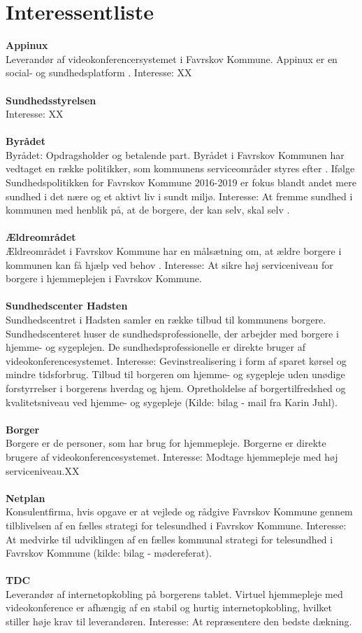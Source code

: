 \documentclass[10pt,a4paper]{article}
\begin{document}
\section{Interessentliste}
\textbf{Appinux}\\
 Leverandør af videokonferencersystemet i Favrskov Kommune. Appinux er en social- og sundhedsplatform \cite{appinuxwebsite}.
Interesse: XX\\ \\
\textbf{Sundhedsstyrelsen}\\
Interesse: XX\\ \\
\textbf{Byrådet}\\
Byrådet: Opdragsholder og betalende part. Byrådet i Favrskov Kommunen har vedtaget en række politikker, som kommunens serviceområder styres efter \cite{favrskovkommune}. Ifølge Sundhedspolitikken for Favrskov Kommune 2016-2019 er fokus blandt andet mere sundhed i det nære og et aktivt liv i sundt miljø.
Interesse: At fremme sundhed i kommunen med henblik på, at de borgere, der kan selv, skal selv \cite{favrskovkommune2}.\\ \\
\textbf{Ældreområdet}\\
Ældreområdet i Favrskov Kommune har en målsætning om, at ældre borgere i kommunen kan få hjælp ved behov \cite{favrskovkommune3}.
Interesse: At sikre høj serviceniveau for borgere i hjemmeplejen i Favrskov Kommune. \\ \\
\textbf{Sundhedscenter Hadsten}\\
Sundhedscentret i Hadsten samler en række tilbud til kommunens borgere. Sundhedscenteret huser de sundhedsprofessionelle, der arbejder med borgere i hjemme- og sygeplejen. De sundhedsprofessionelle er direkte bruger af videokonferencesystemet.
Interesse: Gevinstrealisering i form af sparet kørsel og mindre tidsforbrug. Tilbud til borgeren om hjemme- og sygepleje uden unødige forstyrrelser i borgerens hverdag og hjem. Opretholdelse af borgertilfredshed og kvalitetsniveau ved hjemme- og sygepleje (Kilde: bilag - mail fra Karin Juhl).\\ \\
\textbf{Borger}\\
Borgere er de personer, som har brug for hjemmepleje. Borgerne er direkte brugere af videokonferencesystemet.
Interesse: Modtage hjemmepleje med høj serviceniveau.XX\\ \\
\textbf{Netplan}\\
Konsulentfirma\cite{netplan}, hvis opgave er at vejlede og rådgive Favrskov Kommune gennem tilblivelsen af en fælles strategi for telesundhed i Favrskov Kommune.
Interesse: At medvirke til udviklingen af en fælles kommunal strategi for telesundhed i Favrskov Kommune (kilde: bilag - mødereferat).\\ \\
\textbf{TDC}\\
Leverandør af internetopkobling på borgerens tablet. Virtuel hjemmepleje med videokonference er afhængig af en stabil og hurtig internetopkobling, hvilket stiller høje krav til leverandøren. Interesse: At repræsentere den bedste dækning.
\end{document}
